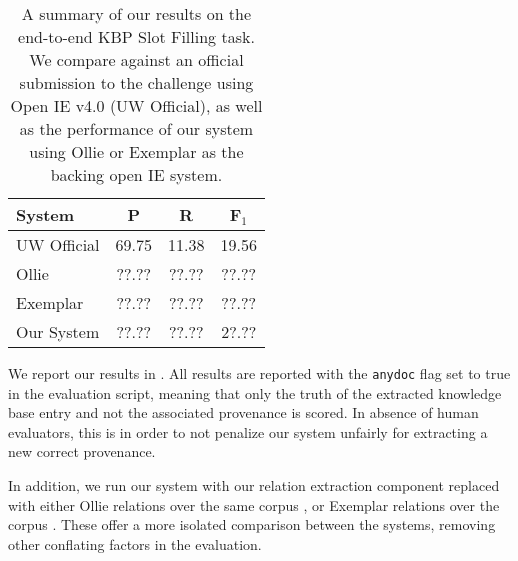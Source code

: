 \begin{table}
\begin{center}
\begin{tabular}{l|cc:c}
\textbf{System} & \textbf{P} & \textbf{R} & \textbf{F$_1$} \\
\hline
UW Official & 69.75 & 11.38 & 19.56 \\
Ollie       & ??.?? & ??.?? & ??.?? \\
Exemplar    & ??.?? & ??.?? & ??.?? \\
\hline
Our System  & ??.?? & ??.?? & 2?.?? \\
\end{tabular}
\end{center}
\caption{\label{tab:results}
A summary of our results on the end-to-end KBP Slot Filling task.
We compare against an official submission to the challenge using
  Open IE v4.0 (UW Official), as well as the performance of our system
  using Ollie or Exemplar as the backing open IE system.
}
\end{table}

We report our results in .
All results are reported with the \texttt{anydoc} flag set to true
  in the evaluation script, meaning that only the truth of the extracted
  knowledge base entry and not the associated provenance is scored.
In absence of human evaluators, this is in order to not penalize our 
  system unfairly for extracting a new correct provenance.

In addition, we run our system with our relation extraction component replaced
  with either Ollie relations over the same corpus \cite{key:2012mausam-ollie},
  or Exemplar relations over the corpus \cite{key:2013mesquita-exemplar}.
These offer a more isolated comparison between the systems, removing
  other conflating factors in the evaluation.
